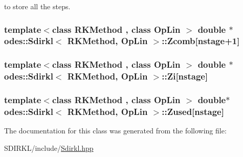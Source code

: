 to store all the steps. 

\hypertarget{classodes_1_1Sdirkl_a9b1c9dcec951a5c76311cf692f711861}{
\subsubsection[{Zcomb}]{\setlength{\rightskip}{0pt plus 5cm}template$<$class R\-K\-Method , class Op\-Lin $>$ double $\ast$ {\bf odes\-::\-Sdirkl}$<$ R\-K\-Method, Op\-Lin $>$\-::Zcomb\mbox{[}{\bf nstage}+1\mbox{]}\hspace{0.3cm}{\ttfamily [private]}}}\label{classodes_1_1Sdirkl_a9b1c9dcec951a5c76311cf692f711861}
\hypertarget{classodes_1_1Sdirkl_a4fddb392aa56e3b527d340e965e5cad2}{
\subsubsection[{Zi}]{\setlength{\rightskip}{0pt plus 5cm}template$<$class R\-K\-Method , class Op\-Lin $>$ double $\ast$ {\bf odes\-::\-Sdirkl}$<$ R\-K\-Method, Op\-Lin $>$\-::Zi\mbox{[}{\bf nstage}\mbox{]}\hspace{0.3cm}{\ttfamily [private]}}}\label{classodes_1_1Sdirkl_a4fddb392aa56e3b527d340e965e5cad2}
\hypertarget{classodes_1_1Sdirkl_a8992552ff8a2c441402317b9127a4859}{
\subsubsection[{Zused}]{\setlength{\rightskip}{0pt plus 5cm}template$<$class R\-K\-Method , class Op\-Lin $>$ double$\ast$ {\bf odes\-::\-Sdirkl}$<$ R\-K\-Method, Op\-Lin $>$\-::Zused\mbox{[}{\bf nstage}\mbox{]}\hspace{0.3cm}{\ttfamily [private]}}}\label{classodes_1_1Sdirkl_a8992552ff8a2c441402317b9127a4859}


The documentation for this class was generated from the following file\-:\begin{DoxyCompactItemize}
\item 
S\-D\-I\-R\-K\-L/include/\hyperlink{Sdirkl_8hpp}{Sdirkl.\-hpp}\end{DoxyCompactItemize}
